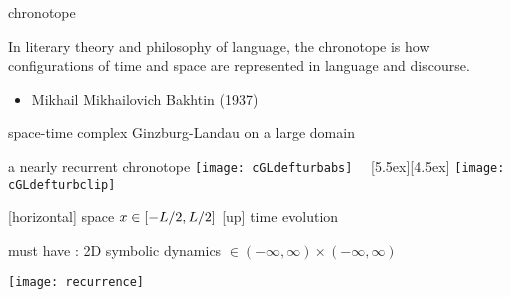 \begin{frame}{chronotope
}
\begin{bartlett}{
In literary theory and philosophy of language, the chronotope is how
configurations of time and space are represented in language and
discourse.
                }
\end{bartlett}

\bigskip
\bigskip

\begin{itemize}
  \item Mikhail Mikhailovich Bakhtin (1937)
\end{itemize}
\end{frame}

\begin{frame}{space-time complex Ginzburg-Landau on a large domain}
\begin{block}{a nearly recurrent chronotope}
  \texttt{[image: cGLdefturbabs]}%
~~\raisebox{+3.33ex}[5.5ex][4.5ex]
		 {\texttt{[image: cGLdefturbclip]}}
\end{block}

{\footnotesize
[horizontal] space $x \in [-L/2,L/2]$
\qquad
{[up]} time evolution
}
\end{frame}

\begin{frame}{
must have
: 2D symbolic dynamics
$\in (-\infty, \infty)\times (-\infty, \infty)$
             }
\begin{center}
\texttt{[image: recurrence]}
\end{center}

\end{frame}


